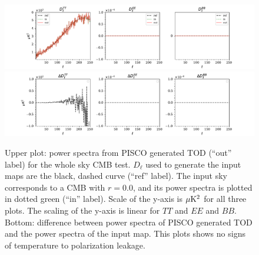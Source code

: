 \documentclass[a4paper,11pt]{article}
\begin{document}
\begin{figure}
	\centering
	\includegraphics[width=1\textwidth, trim = {2.2cm 0.0cm 2.3cm 0.0cm}, clip ]{figures/whole_sky_random_offsets_unpol.pdf}
	\includegraphics[width=1\textwidth, trim = {2.2cm 0.0cm 2.3cm 0.0cm}, clip ]{figures/whole_sky_random_offsets_unpol_residuals.pdf}
	\caption{Upper plot: power spectra from PISCO generated TOD (``out'' label) for the whole sky CMB test. $D_\ell$ used to generate the input maps are the black, dashed curve (``ref'' label). The input sky corresponds to a CMB with $r=0.0$, and its power spectra is plotted in dotted green (``in'' label). Scale of the y-axis is $\mu\rm{K}^2$ for all three plots. The scaling of the y-axis is linear for $TT$ and $EE$ and $BB$. Bottom: difference between power spectra of PISCO generated TOD and the power spectra of the input map. This plots shows no signs of temperature to polarization leakage. }
	\label{fig::pisco4wholesky_random_offsets_unpol}
\end{figure}
\end{document}
